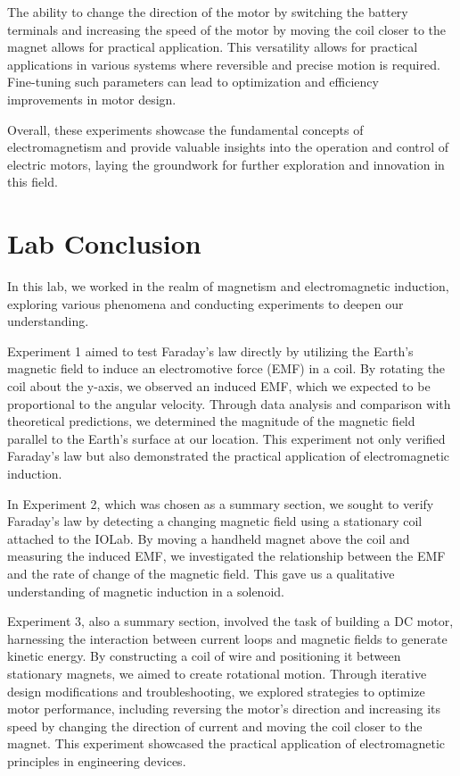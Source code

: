 \documentclass[11pt]{article}
\let\oldsection\section
\renewcommand\section{\clearpage\oldsection}
\begin{document}
    The ability to change the direction of the motor by switching the battery terminals and increasing the speed of the motor by moving the coil closer to the magnet allows for practical application. This versatility allows for practical applications in various systems where reversible and precise motion is required. Fine-tuning such parameters can lead to optimization and efficiency improvements in motor design.
    
    Overall, these experiments showcase the fundamental concepts of electromagnetism and provide valuable insights into the operation and control of electric motors, laying the groundwork for further exploration and innovation in this field.


    \section{Lab Conclusion}\label{sec:lab_conclusion}
    In this lab, we worked in the realm of magnetism and electromagnetic induction, exploring various phenomena and conducting experiments to deepen our understanding. 

    Experiment 1 aimed to test Faraday’s law directly by utilizing the Earth’s magnetic field to induce an electromotive force (EMF) in a coil. By rotating the coil about the y-axis, we observed an induced EMF, which we expected to be proportional to the angular velocity. Through data analysis and comparison with theoretical predictions, we determined the magnitude of the magnetic field parallel to the Earth’s surface at our location. This experiment not only verified Faraday’s law but also demonstrated the practical application of electromagnetic induction.

    In Experiment 2, which was chosen as a summary section, we sought to verify Faraday’s law by detecting a changing magnetic field using a stationary coil attached to the IOLab. By moving a handheld magnet above the coil and measuring the induced EMF, we investigated the relationship between the EMF and the rate of change of the magnetic field. This gave us a qualitative understanding of magnetic induction in a solenoid.

    Experiment 3, also a summary section, involved the task of building a DC motor, harnessing the interaction between current loops and magnetic fields to generate kinetic energy. By constructing a coil of wire and positioning it between stationary magnets, we aimed to create rotational motion. Through iterative design modifications and troubleshooting, we explored strategies to optimize motor performance, including reversing the motor’s direction and increasing its speed by changing the direction of current and moving the coil closer to the magnet. This experiment showcased the practical application of electromagnetic principles in engineering devices.
\end{document}
